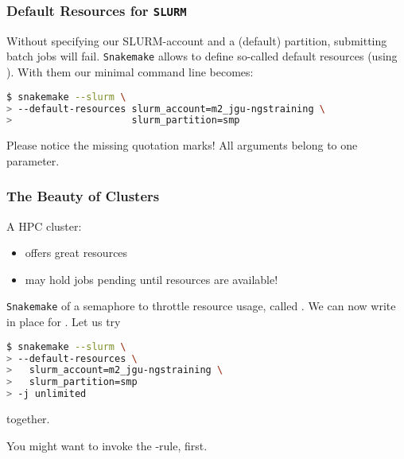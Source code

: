 \begin{frame}[fragile]
  \frametitle{Default Resources for \texttt{SLURM}}
  Without specifying our SLURM-account and a (default) partition, submitting batch jobs will fail. \texttt{Snakemake} allows to define so-called default resources (using ). With them our minimal command line becomes:
  \begin{lstlisting}[language=Bash, style=Shell, breaklines=true]
$ snakemake --slurm \
> --default-resources slurm_account=m2_jgu-ngstraining \
>                     slurm_partition=smp
  \end{lstlisting}
  \begin{hint}
  	Please notice the missing quotation marks! All arguments belong to one parameter.
  \end{hint}
\end{frame}

\begin{frame}[fragile]
  \frametitle{The Beauty of Clusters}
  A HPC cluster:
  \begin{itemize}
   \item offers great resources
   \item may hold jobs pending until resources are available!
  \end{itemize}
  \pause
  \texttt{Snakemake} of a semaphore to throttle resource usage, called . We can now write  in place for . Let us try
  \begin{lstlisting}[language=Bash, style=Shell, basicstyle=\footnotesize]
$ snakemake --slurm \
> --default-resources \ 
>   slurm_account=m2_jgu-ngstraining \
>   slurm_partition=smp
> -j unlimited
  \end{lstlisting}
  together.
  \begin{hint}
  	You might want to invoke the -rule, first.
  \end{hint}
\end{frame}

